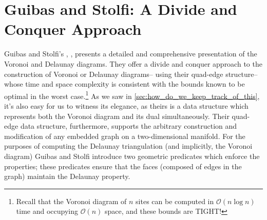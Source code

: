 \documentclass[12pt,twoside]{reedthesis}
\begin{document}
  \section{Guibas and Stolfi: A Divide and Conquer Approach} %
  \label{sec:divide_and_conquer}
    Guibas and Stolfi's , \citealp{guibas}, presents a detailed and comprehensive presentation of the Voronoi and Delaunay diagrams. They offer a divide and conquer approach to the construction of Voronoi or Delaunay diagrams-- using their quad-edge structure-- whose time and space complexity is consistent with the bounds known to be optimal in the worst case.\footnote{Recall that the Voronoi diagram of $n$ sites can be computed in $\mathcal{O}(n\log n)$ time and occupying $\mathcal{O}(n)$ space, and these bounds are TIGHT!} As we saw in \cref{sec:how_do_we_keep_track_of_this}, it's also easy for us to witness its elegance, as theirs is a data structure which represents both the Voronoi diagram and its dual simultaneously. Their quad-edge data structure, furthermore, supports the arbitrary construction and modification of any embedded graph on a two-dimensional manifold. For the purposes of computing the Delaunay triangulation (and implicitly, the Voronoi diagram)  Guibas and Stolfi introduce two geometric predicates which enforce the  properties; these predicates ensure that the faces (composed of edges in the graph) maintain the Delaunay property.

  

\end{document}
